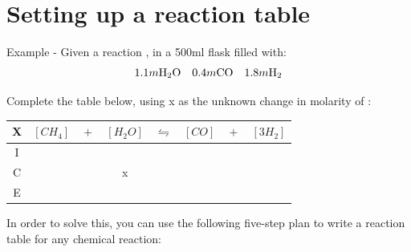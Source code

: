 \documentclass{article}  %
\begin{document}
\section*{Setting up a reaction table}
Example - Given a reaction , in a 500ml flask filled with: 
\begin{equation*}
    \begin{aligned}
        1.1m \ce{H2O} \quad 0.4m \ce{CO} \quad 1.8m \ce{H2}
    \end{aligned}
\end{equation*}

Complete the table below, using x as the unknown change in molarity of :

\begin{tabular}{c|c@{}c@{}c@{}c@{}c@{}c@{}c}
    \hline
    X   & $[CH_4]$ & ${}+{}$ & $[H_2O]$ & ${}\leftrightharpoons{}$ & $[CO]$ & ${}+{}$ & $[3H_2]$ \\
    \hline
    I   &      &&     &&     &&   \\
    C   &      &&  x   &&     &&   \\
    E   &      &&     &&     &&   \\      

\end{tabular}

In order to solve this, you can use the following five-step plan to write a reaction table for any chemical reaction:
\end{document}
